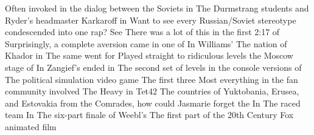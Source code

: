 \documentclass[12pt]{book}
\begin{document}
Often invoked in the dialog between the Soviets in The Durmstrang students and Ryder's headmaster Karkaroff in Want to see every Russian/Soviet stereotype condescended into one rap? See There was a lot of this in the first 2:17 of Surprisingly, a complete aversion came in one of In Williams' The nation of Khador in The same went for Played straight to ridiculous levels the Moscow stage of In Zangief's ended in The second set of levels in the console versions of The political simulation video game The first three Most everything in the fan community involved The Heavy in Tet42 The countries of Yuktobania, Erusea, and Estovakia from the Comrades, how could Jasmarie forget the In The raced team In The six-part finale of Weebl's The first part of the 20th Century Fox animated film
\end{document}
